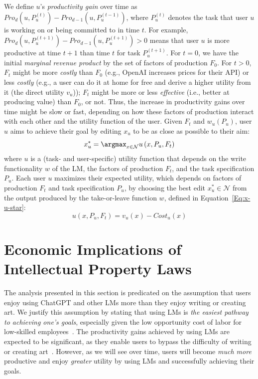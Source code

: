 \documentclass{article} %
\begin{document}
We define $u$'s \textit{productivity gain} over time as $Pro_d(u, P_u^{(t)}) - Pro_{d-1}(u, P_u^{(t-1)})$, where $P_u^{(t)}$ denotes the task that user $u$ is working on or being committed to in time $t$.
For example, $Pro_d(u, P_u^{(t+1)}) - Pro_{d-1}(u , P_u^{(t+1)}) > 0$ means that user $u$ is more productive at time $t+1$ than time $t$ for task $P_u^{(t+1)}$.
For $t=0$, we have the initial \emph{marginal revenue product} by the set of factors of production $F_0$.
For $t>0$, $F_t$ might be more \emph{costly} than $F_0$ (e.g., OpenAI increases prices for their API) or less \emph{costly} (e.g., a user can do it at home for free and derive a higher utility from it (the direct utility $v_u$)); $F_t$ might be more or less \emph{effective} (i.e., better at producing value) than $F_0$, or not.
Thus, the increase in productivity gains over time might be slow or fast, depending on how these factors of production interact with each other and the utility function of the user.
Given $F_t$ and $w_u(P_u)$, user $u$ aims to achieve their goal by editing $x_u$ to be as close as possible to their aim:
\begin{equation}
    x^*_u = \argmax_{x \in \mathcal{N}} u \left( x, P_u, F_t \right)
    \label{Eq:x-u-star}
\end{equation}
where $u$ is a (task- and user-specific) utility function that depends on the write functionality $w$ of the LM, the factors of production $F_t$, and the task specification $P_u$.
Each user $u$ maximizes their expected utility, which depends on factors of production $F_t$ and task specification $P_u$, by choosing the best edit $x^*_u \in \mathcal{N}$ from the output produced by the take-or-leave function $w$, defined in Equation~\ref{Eq:x-u-star}:
\begin{equation}
    u\left( x, P_u, F_t \right) = v_u \left( x \right) - Cost_u \left( x \right)
\end{equation}


\section{Economic Implications of Intellectual Property Laws}

\label{IPlaws}

The analysis presented in this section is predicated on the assumption that users enjoy using ChatGPT and other LMs more than they enjoy writing or creating art.
We justify this assumption by stating that using LMs is \emph{the easiest pathway to achieving one's goals}, especially given the low opportunity cost of labor for low-skilled employees~\citep{autor2015there}.
The productivity gains achieved by using LMs are expected to be significant, as they enable users to bypass the difficulty of writing or creating art~\citep{langley00}.
However, as we will see over time, users will become \emph{much more} productive and enjoy \emph{greater} utility by using LMs and successfully achieving their goals.
\end{document}
